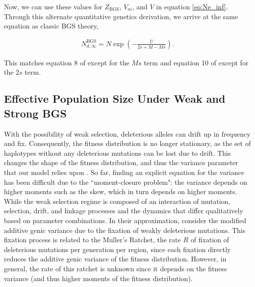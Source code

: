 \documentclass[11pt]{article}
\begin{document}
Now, we can use these values for $Z_\text{BGS}$, $V_m$, and $V$ in equation
\eqref{eq:Ne_inf}. Through this alternate quantitative genetics derivation, we
arrive at the same equation as classic BGS theory,

\begin{align}
  N_{d,\infty}^\text{BGS} = N \exp\left( - \frac{U}{2s + M - Ms} \right).
\end{align}

This matches equation 8 of \textcite{Hudson1995-xc} except for the $Ms$ term
and equation 10 of \textcite{Nordborg1996-nq} except for the $2s$ term.

\subsection{Effective Population Size Under Weak and Strong BGS}
\label{supp:weak-strong}

With the possibility of weak selection, deleterious alleles can drift up in
frequency and fix. Consequently, the fitness distribution is no longer
stationary, as the set of haplotypes without any deleterious mutations can be
lost due to drift. This changes the shape of the fitness distribution, and thus
the variance parameter that our model relies upon
\parencite{Gessler1995-hz,OFallon2010-my,Good2013-lp,Haigh1978-gt,Higgs1995-xc}.
So far, finding an explicit equation for the variance has been difficult due to
the ``moment-closure problem": the variance depends on higher moments such as
the skew, which in turn depends on higher moments. While the weak selection
regime is composed of an interaction of mutation, selection, drift, and linkage
processes and the dynamics that differ qualitatively based on parameter
combinations. In their approximation, \textcite{Santiago2016-mu} consider the
modified additive genic variance due to the fixation of weakly deleterious
mutations. This fixation process is related to the Muller's Ratchet, the rate
$R$ of fixation of deleterious mutations per generation per region, since each
fixation directly reduces the additive genic variance of the fitness
distribution. However, in general, the rate of this ratchet is unknown since it
depends on the fitness variance (and thus higher moments of the fitness
distribution).

\end{document}
